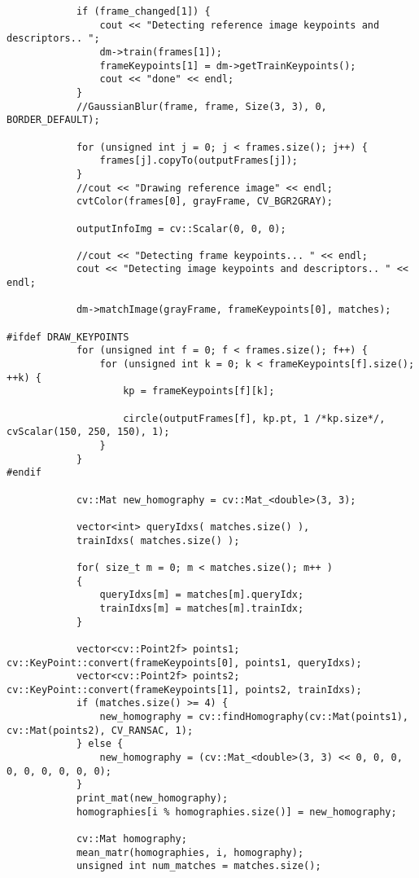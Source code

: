 \begin{lstlisting}
            if (frame_changed[1]) {
                cout << "Detecting reference image keypoints and descriptors.. ";
                dm->train(frames[1]);
                frameKeypoints[1] = dm->getTrainKeypoints();
                cout << "done" << endl;
            } 		
			//GaussianBlur(frame, frame, Size(3, 3), 0, BORDER_DEFAULT);
            
            for (unsigned int j = 0; j < frames.size(); j++) {
                frames[j].copyTo(outputFrames[j]);                
            }       
			//cout << "Drawing reference image" << endl;
			cvtColor(frames[0], grayFrame, CV_BGR2GRAY);
			
			outputInfoImg = cv::Scalar(0, 0, 0);
			
			//cout << "Detecting frame keypoints... " << endl;
			cout << "Detecting image keypoints and descriptors.. " << endl;
            
			dm->matchImage(grayFrame, frameKeypoints[0], matches);
            
#ifdef DRAW_KEYPOINTS
            for (unsigned int f = 0; f < frames.size(); f++) {
                for (unsigned int k = 0; k < frameKeypoints[f].size(); ++k) {
                    kp = frameKeypoints[f][k];
                    
                    circle(outputFrames[f], kp.pt, 1 /*kp.size*/, cvScalar(150, 250, 150), 1);
                }
			}
#endif		
            
			cv::Mat new_homography = cv::Mat_<double>(3, 3);
			
			vector<int> queryIdxs( matches.size() ),
			trainIdxs( matches.size() );
			
			for( size_t m = 0; m < matches.size(); m++ )
			{
				queryIdxs[m] = matches[m].queryIdx;
				trainIdxs[m] = matches[m].trainIdx;
			}
			
			vector<cv::Point2f> points1; cv::KeyPoint::convert(frameKeypoints[0], points1, queryIdxs);
			vector<cv::Point2f> points2; cv::KeyPoint::convert(frameKeypoints[1], points2, trainIdxs);
			if (matches.size() >= 4) {
				new_homography = cv::findHomography(cv::Mat(points1), cv::Mat(points2), CV_RANSAC, 1);
			} else {
				new_homography = (cv::Mat_<double>(3, 3) << 0, 0, 0, 0, 0, 0, 0, 0, 0);
			}
			print_mat(new_homography);
            homographies[i % homographies.size()] = new_homography;
            
            cv::Mat homography;
            mean_matr(homographies, i, homography);
			unsigned int num_matches = matches.size();
            

\end{lstlisting}
